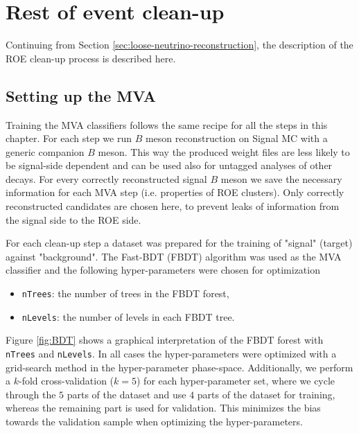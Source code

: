 \documentclass[headings=standardclasses,headings=big,oneside,a4paper,openany,12pt]{scrbook}
\begin{document}
\chapter{Rest of event clean-up}
\label{ch:roe}

Continuing from Section \ref{sec:loose-neutrino-reconstruction}, the description of the ROE clean-up process is described here. 

\section{Setting up the MVA}

Training the MVA classifiers follows the same recipe for all the steps in this chapter. For each step we run $B$ meson reconstruction on Signal MC with a generic companion $B$ meson. This way the produced weight files are less likely to be signal-side dependent and can be used also for untagged analyses of other decays. For every correctly reconstructed signal $B$ meson we save the necessary information for each MVA step (i.e. properties of ROE clusters). Only correctly reconstructed candidates are chosen here, to prevent leaks of information from the signal side to the ROE side.

For each clean-up step a dataset was prepared for the training of "signal" (target) against "background". The Fast-BDT (FBDT) \cite{keck2017fastbdt} algorithm was used as the MVA classifier and the following hyper-parameters were chosen for optimization
\begin{itemize}
\item \texttt{nTrees}: the number of trees in the FBDT forest,
\item \texttt{nLevels}: the number of levels in each FBDT tree.
\end{itemize}

Figure \ref{fig:BDT} shows a graphical interpretation of the FBDT forest with \texttt{nTrees} and \texttt{nLevels}. In all cases the hyper-parameters were optimized with a grid-search method in the hyper-parameter phase-space. Additionally, we perform a $k$-fold cross-validation ($k=5$) for each hyper-parameter set, where we cycle through the $5$ parts of the dataset and use $4$ parts of the dataset for training, whereas the remaining part is used for validation. This minimizes the bias towards the validation sample when optimizing the hyper-parameters.
\end{document}
